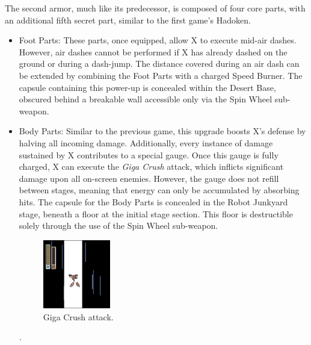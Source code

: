 The second armor, much like its predecessor, is composed of four core parts, with an additional fifth secret part, similar to the first game's Hadoken.
\begin{itemize}
\item Foot Parts: These parts, once equipped, allow X to execute mid-air dashes. However, air dashes cannot be performed if X has already dashed on the ground or during a dash-jump. The distance covered during an air dash can be extended by combining the Foot Parts with a charged Speed Burner. The capsule containing this power-up is concealed within the Desert Base, obscured behind a breakable wall accessible only via the Spin Wheel sub-weapon.

\item Body Parts: Similar to the previous game, this upgrade boosts X's defense by halving all incoming damage. Additionally, every instance of damage sustained by X contributes to a special gauge. Once this gauge is fully charged, X can execute the \textit{Giga Crush} attack, which inflicts significant damage upon all on-screen enemies. However, the gauge does not refill between stages, meaning that energy can only be accumulated by absorbing hits. The capsule for the Body Parts is concealed in the Robot Junkyard stage, beneath a floor at the initial stage section. This floor is destructible solely through the use of the Spin Wheel sub-weapon.
\begin{figure}[htp]
	\centering
	\includegraphics[height=3cm]{figures/X2/weapons/G_crush_1.png}
	\caption{Giga Crush attack.}
\end{figure}.


\end{itemize}
